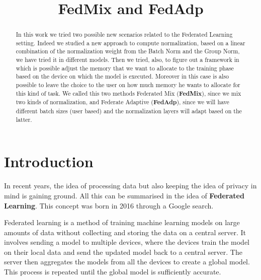 \documentclass[conference]{IEEEtran}
\begin{document}
\title{FedMix and FedAdp\\
}

\author{
\and
{}
\and
{}
}

\maketitle
\thispagestyle{plain}
\pagestyle{plain}


\begin{abstract}
In this work we tried two possible new scenarios related to the Federated Learning setting. Indeed we studied a new approach to compute normalization, based on a linear combination of the normalization weight from the Batch Norm and the Group Norm, we have tried it in different models. Then we tried, also, to figure out a framework in which is possible adjust the memory that we want to allocate to the training phase based on the device on which the model is executed. Moreover in this case is also possible to leave the choice to the user on how much memory he wants to allocate for this kind of task. We called this two methods Federated Mix (\textbf{FedMix}), since we mix two kinds of normalization, and Federate Adaptive (\textbf{FedAdp}), since we will have different batch sizes (user based) and the normalization layers will adapt based on the latter.
\end{abstract}


\section{Introduction}
In recent years, the idea of processing data but also keeping the idea of privacy in mind is gaining ground. All this can be summarised in the idea of \textbf{Federated Learning}. This concept was born in 2016 through a Google search.

Federated learning is a method of training machine learning models on large amounts of data without collecting and storing the data on a central server. It involves sending a model to multiple devices, where the devices train the model on their local data and send the updated model back to a central server. The server then aggregates the models from all the devices to create a global model. This process is repeated until the global model is sufficiently accurate. 
\end{document}
